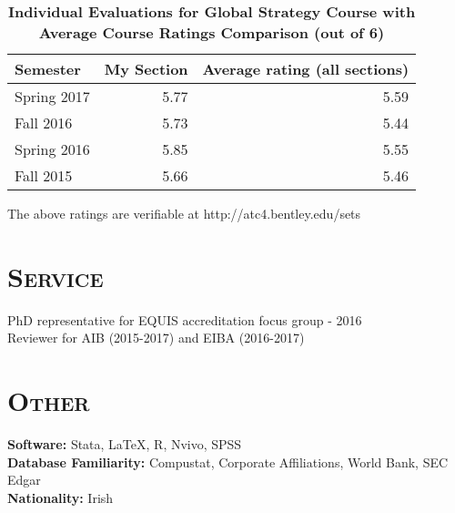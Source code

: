 \documentclass[margin, 12pt]{res}
\begin{document}
\begin{resume}
%
 
\begin{table}[htbp]
  \centering
  \caption{\textbf{Individual Evaluations for Global Strategy Course	with Average Course Ratings Comparison (out of 6)}}
    \begin{tabular}{lrr}
    \midrule
    Semester & My Section & Average rating (all sections) \\
    \midrule
    Spring 2017 & 5.77  & 5.59 \\
    Fall 2016 & 5.73  & 5.44 \\
    Spring 2016 & 5.85  & 5.55 \\
    Fall 2015 & 5.66  & 5.46 \\
    \bottomrule


    \end{tabular}%
    
  The above ratings are verifiable at http://atc4.bentley.edu/sets    
  \label{tab:addlabel}%
\end{table}%
 
 \section{\normalfont\textsc{Service}}
PhD representative for EQUIS accreditation focus group - 2016 \\
Reviewer for AIB (2015-2017) and EIBA (2016-2017)




 
\section{\normalfont\textsc{Other}}
\textbf{Software:} Stata, \LaTeX, R, Nvivo, SPSS \\
\textbf{Database Familiarity:} Compustat, Corporate Affiliations, World Bank, SEC Edgar   \\
\textbf{Nationality:} Irish  \\

\end{resume}
\end{document}
